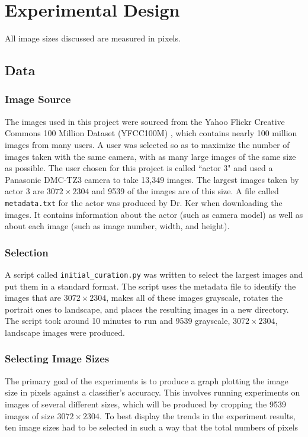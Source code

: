 \documentclass[11pt,a4paper,twoside,openright]{report}
\begin{document}
\chapter{Experimental Design}

All image sizes discussed are measured in pixels.

\section{Data}


\subsection{Image Source}
The images used in this project were sourced from the Yahoo Flickr Creative Commons 100 Million Dataset (YFCC100M) \cite{yfcc100m}, which contains nearly 100 million images from many users. A user was selected so as to maximize the number of images taken with the same camera, with as many large images of the same size as possible. The user chosen for this project is called ``actor 3" and used a Panasonic DMC-TZ3 camera to take 13,349 images. The largest images taken by actor 3 are $3072 \times 2304$ and 9539 of the images are of this size. A file called \texttt{metadata.txt} for the actor was produced by Dr. Ker when downloading the images. It contains information about the actor (such as camera model) as well as about each image (such as image number, width, and height).

\subsection{Selection}
A script called \texttt{initial\_curation.py} was written to select the largest images and put them in a standard format. The script uses the metadata file to identify the images that are $3072\times2304$, makes all of these images grayscale, rotates the portrait ones to landscape, and places the resulting images in a new directory. The script took around 10 minutes to run and 9539 grayscale, $3072\times2304$, landscape images were produced.

\subsection{Selecting Image Sizes}
The primary goal of the experiments is to produce a graph plotting the image size in pixels against a classifier's accuracy. This involves running experiments on images of several different sizes, which will be produced by cropping the 9539 images of size $3072\times2304$. To best display the trends in the experiment results, ten image sizes had to be selected in such a way that the total numbers of pixels 
\end{document}
